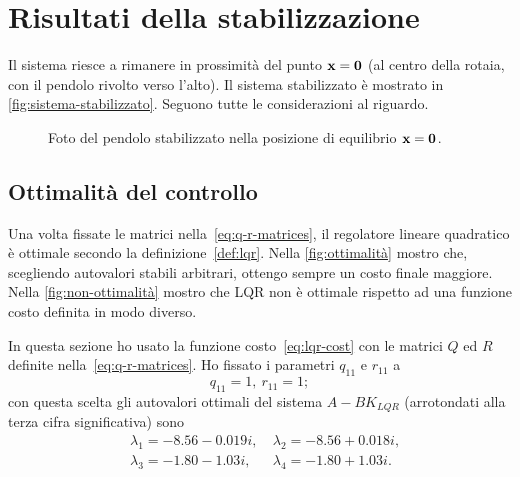 \section{Risultati della stabilizzazione}
Il sistema riesce a rimanere in prossimità del punto $\mathbf{x} = \mathbf{0}$
(al centro della rotaia, con il pendolo rivolto verso l'alto).
Il sistema stabilizzato è mostrato in \autoref{fig:sistema-stabilizzato}.
Seguono tutte le considerazioni al riguardo.


\begin{figure}[H]
    \centering
    \caption[Pendolo stabilizzato]{Foto del pendolo stabilizzato nella
    posizione di equilibrio $\mathbf{x} = \mathbf{0}$.}
    \label{fig:sistema-stabilizzato}
\end{figure}


\subsection{Ottimalità del controllo}
Una volta fissate le matrici nella~\eqref{eq:q-r-matrices},
il regolatore lineare quadratico è ottimale secondo la
definizione~\ref{def:lqr}.
Nella \autoref{fig:ottimalità} mostro che, scegliendo autovalori
stabili arbitrari, ottengo sempre un costo finale maggiore.
Nella \autoref{fig:non-ottimalità} mostro che LQR non è
ottimale rispetto ad una funzione costo definita in modo diverso.

In questa sezione ho usato la funzione costo~\eqref{eq:lqr-cost} con le matrici
$Q$ ed $R$ definite nella~\eqref{eq:q-r-matrices}. 
Ho fissato i parametri $q_{11}$ e $r_{11}$ a
\begin{equation*}
    q_{11} = 1,\  r_{11} = 1;
\end{equation*}
con questa scelta gli autovalori ottimali del sistema $A - BK_{LQR}$ (arrotondati alla terza cifra significativa) sono
\begin{equation}
    \left.
        \begin{aligned}
        &\lambda_1 = -8.56 - 0.019i, \
        &\lambda_2 = -8.56 + 0.018i, \\
        &\lambda_3 = -1.80 - 1.03i, \
        &\lambda_4 = -1.80 + 1.03i.
        \end{aligned}
    \right.
    \label{eq:lqr-eigenvalues}
\end{equation}

